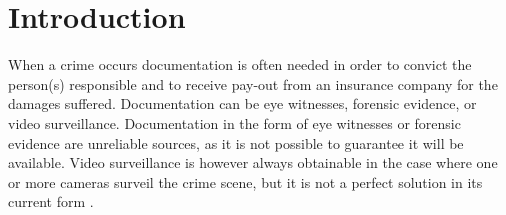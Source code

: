 \chapter{Introduction}
\label{chap:introduction}


When a crime occurs documentation is often needed in order to convict the person(s) responsible and to receive pay-out from an insurance company for the damages suffered.
Documentation can be eye witnesses, forensic evidence, or video surveillance.
Documentation in the form of eye witnesses or forensic evidence are unreliable sources, as it is not possible to guarantee it will be available.
Video surveillance is however always obtainable in the case where one or more cameras surveil the crime scene, but it is not a perfect solution in its current form \citep{whats-wrong-public-video-surveillance}.






